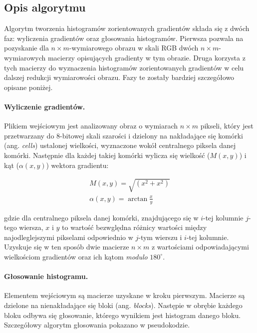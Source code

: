 \documentclass[12pt,a4paper,leqno,oneside,titlepage]{book}
\begin{document}
\subsection{Opis algorytmu}
Algorytm tworzenia histogramów zorientowanych gradientów składa się z dwóch faz: wyliczenia gradientów oraz głosowania histogramów. Pierwsza pozwala na pozyskanie dla $n\times m$-wymiarowego obrazu w skali RGB dwóch $n\times m$-wymiarowych macierzy opisujących gradienty w tym obrazie. Druga korzysta z tych macierzy do wyznaczenia histogramów zorientowanych gradientów w celu dalszej redukcji wymiarowości obrazu. Fazy te zostały bardziej szczegółowo opisane poniżej.

\paragraph{Wyliczenie gradientów.}
Plikiem wejściowym jest analizowany obraz o wymiarach $n\times m$ pikseli, który jest przetwarzany do 8-bitowej skali szarości i dzielony na nakładające się komórki (ang. \textit{cells}) ustalonej wielkości, wyznaczone wokół centralnego piksela danej komórki. Następnie dla każdej takiej komórki wylicza się wielkość ($M(x,y)$) i kąt ($\alpha(x,y)$) wektora gradientu:

\begin{align}
M(x,y) = \sqrt{\left( x^{2}+x^{2}\right)} \\
\alpha(x,y) = \arctan{\frac{x}{y}}
\end{align}

gdzie dla centralnego piksela danej komórki, znajdującego się w $i$-tej kolumnie $j$-tego wiersza, $x$ i $y$ to wartość bezwględna różnicy wartości między najodleglejszymi pikselami odpowiednio w $j$-tym wierszu i $i$-tej kolumnie. Uzyskuje się w ten sposób dwie macierze $n\times m$ z wartościami odpowiadającymi wielkościom gradientów oraz ich kątom \textit{modulo} $180^\circ$\cite{dpi2008}.

\paragraph{Głosowanie histogramu.}
Elementem wejściowym są macierze uzyskane w kroku pierwszym. Macierze są dzielone na nienakładające się bloki (ang. \textit{blocks}). Następie w obrębie każdego bloku odbywa się głosowanie, którego wynikiem jest histogram danego bloku. Szczegółowy algorytm głosowania pokazano w pseudokodzie.
\end{document}
